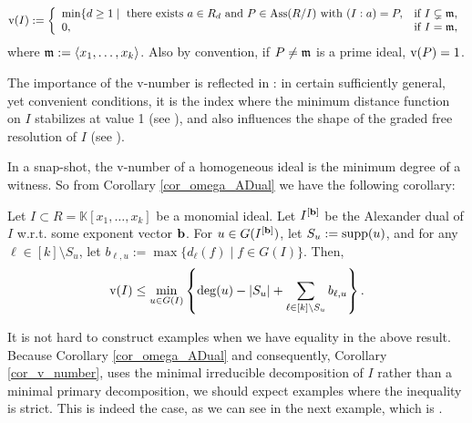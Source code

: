 \documentclass[11pt]{amsart}   %
\begin{document}
$${\rm v}(I):=\left\{
                          \begin{array}{ll}
                            \min\{d\geq 1\mid \mbox{ there exists } a\in R_d \mbox{ and } P\in {\rm Ass}(R/I) \mbox{ with } (I:a)=P, & \hbox{if $I\subsetneq \frak m$,} \\
                            0, & \hbox{if $I= \frak m$,}
                          \end{array}
                        \right.$$ where $\frak m:=\langle x_1,\ldots,x_k\rangle$. Also by convention, if $P\neq\frak m$ is a prime ideal, ${\rm v}(P)=1$.

The importance of the v-number is reflected in \cite[Section 4.1]{CSTVV}: in certain sufficiently general, yet convenient conditions, it is the index where the minimum distance function on $I$ stabilizes at value 1 (see \cite[Proposition 4.6]{CSTVV}), and also influences the shape of the graded free resolution of $I$ (see \cite[Corollary 4.4, Theorem 4.10, Corollary 4.15]{CSTVV}).

In a snap-shot, the v-number of a homogeneous ideal is the minimum degree of a witness. So from Corollary \ref{cor_omega_ADual} we have the following corollary:

\begin{cor}\label{cor_v_number} Let $I\subset R=\mathbb K[x_1,\ldots,x_k]$ be a monomial ideal. Let $I^{[{\bf b}]}$ be the Alexander dual of $I$ w.r.t. some exponent vector ${\bf b}$. For $u\in G(I^{[{\bf b}]})$, let $S_u:={\rm supp}(u)$, and for any $\ell\in[k]\setminus S_u$, let $b_{\ell,u}:=\max\{d_{\ell}(f)\mid f\in G(I)\}$. Then, 
$${\rm v}(I)\leq\min_{u\in G(I)}\left\{\deg(u)-|S_u|+\sum_{\ell\in[k]\setminus S_u}b_{\ell,u}\right\}.$$
\end{cor}

It is not hard to construct examples when we have equality in the above result. Because Corollary \ref{cor_omega_ADual} and consequently, Corollary \ref{cor_v_number}, uses the minimal irreducible decomposition of $I$ rather than a minimal primary decomposition, we should expect examples where the inequality is strict. This is indeed the case, as we can see in the next example, which is \cite[Example 4.3]{CSTVV}.
\end{document}
